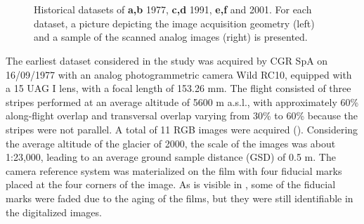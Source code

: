 \begin{figure}
{    } \\
     \\
    \caption{Historical datasets of \textbf{a,b} 1977, \textbf{c,d} 1991, \textbf{e,f} and 2001. For each dataset, a picture depicting the image acquisition geometry (left) and a sample of the scanned analog images (right) is presented.}
    \label{fig:2:datasets_historical}
\end{figure}

The earliest dataset considered in the study was acquired by CGR SpA on 16/09/1977
with an analog photogrammetric camera Wild RC10, equipped with a 15 UAG I lens, with
a focal length of 153.26 mm. The flight consisted of three stripes performed at an average
altitude of 5600 m a.s.l., with approximately 60\% along-flight overlap and transversal
overlap varying from 30\% to 60\% because the stripes were not parallel. A total of 11 RGB
images were acquired (). 
Considering the average altitude of the glacier of \SI{2000}{\masl}, the scale of the images
was about 1:23,000, leading to an average ground
sample distance (GSD) of 0.5 m. The camera reference system was materialized on the film
with four fiducial marks placed at the four corners of the image. As is visible in ,
some of the fiducial marks were faded due to the aging of the films, but they were still
identifiable in the digitalized images.


